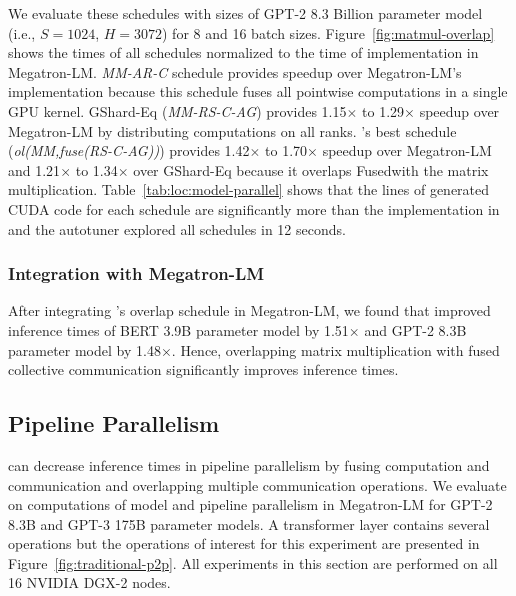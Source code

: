  We evaluate these schedules with sizes of GPT-2 8.3 Billion parameter model (i.e., $S=1024$, $H=3072$) for 8 and 16 batch sizes.
Figure~\ref{fig:matmul-overlap} shows the times of all schedules normalized to the time of implementation in Megatron-LM.
\textit{MM-AR-C} schedule provides speedup over Megatron-LM's implementation because this schedule fuses all pointwise computations in a single GPU kernel.
GShard-Eq (\textit{MM-RS-C-AG}) provides 1.15$\times$ to 1.29$\times$ speedup over Megatron-LM by distributing computations on all ranks.
\tool's best schedule (\textit{ol(MM,fuse(RS-C-AG))}) provides 1.42$\times$ to 1.70$\times$ speedup over Megatron-LM and 1.21$\times$ to 1.34$\times$ over GShard-Eq because it overlaps Fused\allreduce with the matrix multiplication.
Table~\ref{tab:loc:model-parallel} shows that the lines of generated CUDA code for each schedule are significantly more than the implementation in \tool and the autotuner explored all schedules in 12 seconds.

\subsubsection{Integration with Megatron-LM}
\label{sec:experiments:model-parallel:integeration}
After integrating \tool's overlap schedule in Megatron-LM,
we found that \tool improved inference times of BERT 3.9B parameter model by 1.51$\times$ and GPT-2 8.3B parameter model by 1.48$\times$.
Hence, overlapping matrix multiplication with fused collective communication significantly improves inference times.


\subsection{Pipeline Parallelism}
\tool can decrease inference times in pipeline parallelism by fusing computation and communication and overlapping multiple communication operations.
We evaluate \tool on computations of model and pipeline parallelism in Megatron-LM for GPT-2 8.3B and GPT-3 175B parameter models.
A transformer layer contains several operations but the operations of interest for this experiment are presented in Figure~\ref{fig:traditional-p2p}.
All experiments in this section are performed on all 16 NVIDIA DGX-2 nodes.

